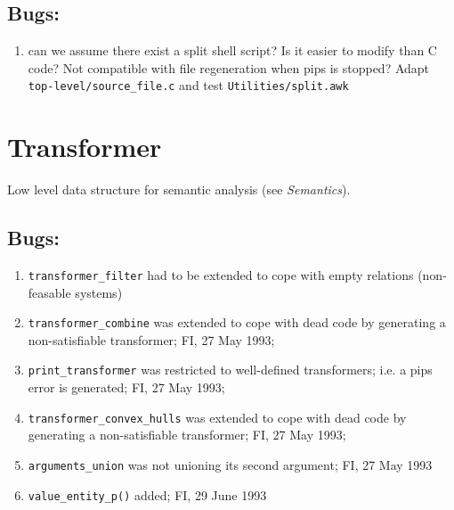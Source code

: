 \subsection{Bugs:}

\begin{enumerate}

  \item can we assume there exist a split shell script? Is it easier
	to modify than C code? Not compatible with file regeneration
	when pips is stopped? Adapt \verb+top-level/source_file.c+
	and test \verb+Utilities/split.awk+

\end{enumerate}

\section{Transformer}

Low level data structure for semantic analysis (see {\em Semantics}).

\subsection{Bugs:}

\begin{enumerate}

  \item \verb+transformer_filter+ had to be extended to cope with
	empty relations (non-feasable systems)

  \item \verb+transformer_combine+ was extended to cope with dead code
	by generating a non-satisfiable transformer; FI, 27 May 1993;

  \item \verb+print_transformer+ was restricted to well-defined
	transformers; i.e. a pips error is generated; FI, 27 May 1993;
	
  \item \verb+transformer_convex_hulls+ was extended to cope with dead code
	by generating a non-satisfiable transformer; FI, 27 May 1993;

  \item \verb+arguments_union+ was not unioning its second argument;
	FI, 27 May 1993

  \item \verb+value_entity_p()+ added; FI, 29 June 1993

\end{enumerate}

